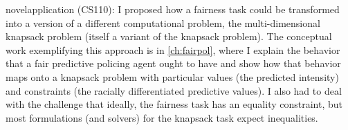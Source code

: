 \begin{itemize}
\hashtag novelapplication (CS110): I proposed how a fairness task could be transformed into a version of a different computational problem, the multi-dimensional knapsack problem (itself a variant of the knapsack problem). The conceptual work exemplifying this approach is in \autoref{ch:fairpol}, where I explain the behavior that a fair predictive policing agent ought to have and show how that behavior maps onto a knapsack problem with particular values (the predicted intensity) and constraints (the racially differentiated predictive values). I also had to deal with the challenge that ideally, the fairness task has an equality constraint, but most formulations (and solvers) for the knapsack task expect inequalities.
\end{itemize}
